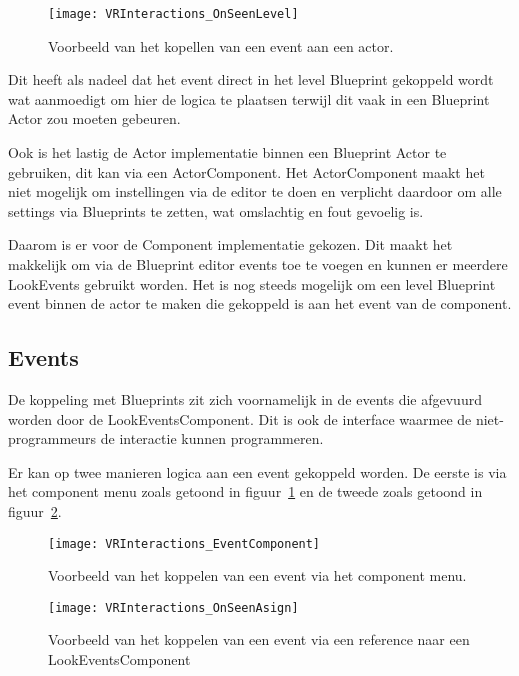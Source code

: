 \begin{figure}[!ht]
  \centering
    \texttt{[image: VRInteractions\_OnSeenLevel]}
    \caption{Voorbeeld van het kopellen van een event aan een actor.}
\end{figure}

Dit heeft als nadeel dat het event direct in het level Blueprint gekoppeld wordt wat aanmoedigt om hier de logica te plaatsen terwijl dit vaak in een Blueprint Actor zou moeten gebeuren.

Ook is het lastig de Actor implementatie binnen een Blueprint Actor te gebruiken, dit kan via een ActorComponent. Het ActorComponent maakt het niet mogelijk om instellingen via de editor te doen en verplicht daardoor om alle settings via Blueprints te zetten, wat omslachtig en fout gevoelig is.

Daarom is er voor de Component implementatie gekozen. Dit maakt het makkelijk om via de Blueprint editor events toe te voegen en kunnen er meerdere LookEvents gebruikt worden. Het is nog steeds mogelijk om een level Blueprint event binnen de actor te maken die gekoppeld is aan het event van de component.

\subsection{Events}
De koppeling met Blueprints zit zich voornamelijk in de events die afgevuurd worden door de LookEventsComponent. Dit is ook de interface waarmee de niet-programmeurs de interactie kunnen programmeren.

Er kan op twee manieren logica aan een event gekoppeld worden. De eerste is via het component menu zoals getoond in figuur~\ref{fig:ComponentMenuEvent} en de tweede zoals getoond in figuur~\ref{fig:ComponentReferenceAsign}.

\begin{figure}[H]
  \centering
    \texttt{[image: VRInteractions\_EventComponent]}
    \caption{Voorbeeld van het koppelen van een event via het component menu.}
    \label{fig:ComponentMenuEvent}
\end{figure}

\begin{figure}[H]
  \centering
    \texttt{[image: VRInteractions\_OnSeenAsign]}
    \caption{Voorbeeld van het koppelen van een event via een reference naar een LookEventsComponent}
    \label{fig:ComponentReferenceAsign}
\end{figure}

